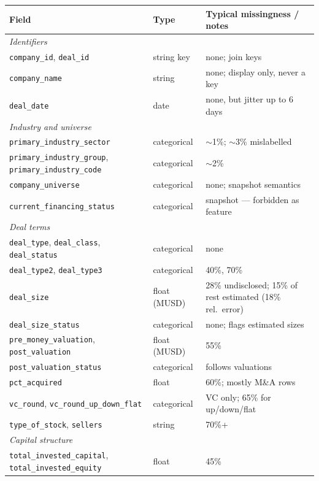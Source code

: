 \begin{table}[htbp]
\centering
\footnotesize
\begin{tabular}{llp{5.0cm}}
\toprule
Field & Type & Typical missingness / notes \\
\midrule
\multicolumn{3}{l}{\emph{Identifiers}} \\
\texttt{company\_id}, \texttt{deal\_id} & string key & none; join keys \\
\texttt{company\_name} & string & none; display only, never a key \\
\texttt{deal\_date} & date & none, but jitter up to 6 days \\
\midrule
\multicolumn{3}{l}{\emph{Industry and universe}} \\
\texttt{primary\_industry\_sector} & categorical & $\sim$1\%; $\sim$3\% mislabelled \\
\texttt{primary\_industry\_group}, \texttt{primary\_industry\_code} & categorical & $\sim$2\% \\
\texttt{company\_universe} & categorical & none; snapshot semantics \\
\texttt{current\_financing\_status} & categorical & snapshot --- forbidden as feature \\
\midrule
\multicolumn{3}{l}{\emph{Deal terms}} \\
\texttt{deal\_type}, \texttt{deal\_class}, \texttt{deal\_status} & categorical & none \\
\texttt{deal\_type2}, \texttt{deal\_type3} & categorical & 40\%, 70\% \\
\texttt{deal\_size} & float (MUSD) & 28\% undisclosed; 15\% of rest estimated (18\% rel.\ error) \\
\texttt{deal\_size\_status} & categorical & none; flags estimated sizes \\
\texttt{pre\_money\_valuation}, \texttt{post\_valuation} & float (MUSD) & 55\% \\
\texttt{post\_valuation\_status} & categorical & follows valuations \\
\texttt{pct\_acquired} & float & 60\%; mostly M\&A rows \\
\texttt{vc\_round}, \texttt{vc\_round\_up\_down\_flat} & categorical & VC only; 65\% for up/down/flat \\
\texttt{type\_of\_stock}, \texttt{sellers} & string & 70\%+ \\
\midrule
\multicolumn{3}{l}{\emph{Capital structure}} \\
\texttt{total\_invested\_capital}, \texttt{total\_invested\_equity} & float & 45\% \\

\end{tabular}
\end{table}
